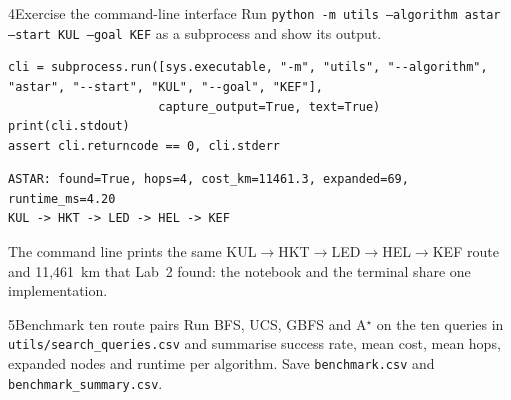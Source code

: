 \begin{labquestion}{4}{Exercise the command-line interface}
Run \texttt{python -m utils --algorithm astar --start KUL --goal KEF} as a subprocess and show its output.
\end{labquestion}

\begin{labanswer}
\begin{lstlisting}[style=utppython]
cli = subprocess.run([sys.executable, "-m", "utils", "--algorithm", "astar", "--start", "KUL", "--goal", "KEF"],
                     capture_output=True, text=True)
print(cli.stdout)
assert cli.returncode == 0, cli.stderr
\end{lstlisting}
\expectedoutput
\begin{lstlisting}[style=utpterminal]
ASTAR: found=True, hops=4, cost_km=11461.3, expanded=69, runtime_ms=4.20
KUL -> HKT -> LED -> HEL -> KEF
\end{lstlisting}
The command line prints the same KUL$\to$HKT$\to$LED$\to$HEL$\to$KEF route and 11,461~km that Lab~2 found: the notebook and the terminal share one implementation.
\end{labanswer}

\begin{labquestion}{5}{Benchmark ten route pairs}
Run BFS, UCS, GBFS and A$^\star$ on the ten queries in \texttt{utils/search\_queries.csv} and summarise success rate, mean cost, mean hops, expanded nodes and runtime per algorithm. Save \texttt{benchmark.csv} and \texttt{benchmark\_summary.csv}.
\end{labquestion}


